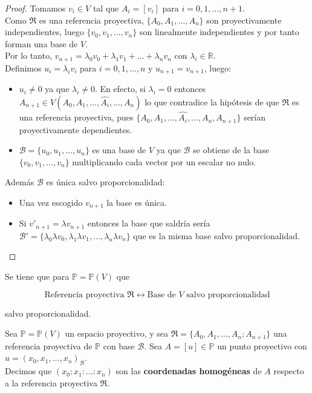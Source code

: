 \begin{proof}
    Tomamos $v_i \in V$ tal que $A_i = [v_i]$ para $i=0,1,\ldots,n+1$.\\
    Como $\mathfrak{R}$ es una referencia proyectiva, $\{A_0, A_1, \ldots, A_n\}$ son proyectivamente independientes, luego $\{v_0, v_1, \ldots, v_n\}$ son linealmente independientes y por tanto forman una base de $V$.\\
    Por lo tanto, $v_{n+1} = \lambda_0 v_0 + \lambda_1 v_1 + \ldots + \lambda_n v_n$ con $\lambda_i \in \mathbb{R}$.\\
    Definimos $u_i = \lambda_i v_i$ para $i=0,1,\ldots,n$ y $u_{n+1} = v_{n+1}$, luego:
    \begin{itemize}
        \item $u_i \neq 0$ ya que $\lambda_i \neq 0$. En efecto, si $\lambda_i = 0$ entonces $A_{n+1} \in V(A_0, A_1, \ldots, \hat{A_i}, \ldots, A_n)$ lo que contradice la hipótesis de que $\mathfrak{R}$ es una referencia proyectiva, pues $\{A_0, A_1, \ldots, \hat{A_i}, \ldots, A_n, A_{n+1}\}$ serían proyectivamente dependientes.
        \item $\mathcal{B} = \{u_0, u_1, \ldots, u_n\}$ es una base de $V$ ya que $\mathcal{B}$ se obtiene de la base $\{v_0, v_1, \ldots, v_n\}$ multiplicando cada vector por un escalar no nulo.
    \end{itemize}
    Además $\mathcal{B}$ es única salvo proporcionalidad:
    \begin{itemize}
        \item Una vez escogido $v_{n+1}$ la base es única.
        \item Si $v'_{n+1} = \lambda v_{n+1}$ entonces la base que saldría sería $\mathcal{B}' = \{\lambda_0 \lambda v_0, \lambda_1 \lambda v_1, \ldots, \lambda_n \lambda v_n\}$ que es la misma base salvo proporcionalidad.
    \end{itemize}
\end{proof}

Se tiene que para $\mathbb{P} = \mathbb{P}(V)$ que

\[
    \text{Referencia proyectiva } \mathfrak{R} \leftrightarrow \text{Base de } V \text{ salvo proporcionalidad}
\]

salvo proporcionalidad.

\begin{definición} 
    Sea $\mathbb{P} = \mathbb{P}(V)$ un espacio proyectivo, y sea $\mathfrak{R} = \{A_0, A_1, \ldots, A_n; A_{n+1}\}$ una referencia proyectiva de $\mathbb{P}$ con base $\mathcal{B}$. Sea $A = [u] \in \mathbb{P}$ un punto proyectivo con $u = (x_0, x_1, \ldots, x_n)_\mathcal{B}$.\\
    Decimos que $(x_0 : x_1 : \ldots : x_n)$ son las \textbf{coordenadas homogéneas} de $A$ respecto a la referencia proyectiva $\mathfrak{R}$.
\end{definición}

